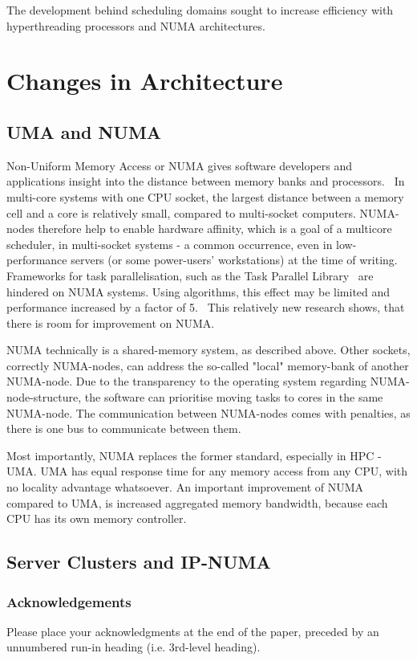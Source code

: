 \documentclass[runningheads]{llncs}
\begin{document}
The development behind scheduling domains sought to increase efficiency with hyperthreading processors and NUMA architectures.\cite{lwn-kernel-dev}

\section{Changes in Architecture}
\subsection{UMA and NUMA}
Non-Uniform Memory Access or NUMA gives software developers and applications insight into the distance between memory banks and processors.~\cite{numa-policies-bolosky} In multi-core systems with one CPU socket, the largest distance between a memory cell and a core is relatively small, compared to multi-socket computers. NUMA-nodes therefore help to enable hardware affinity, which is a goal of a multicore scheduler, in multi-socket systems - a common occurrence, even in low-performance servers (or some power-users' workstations) at the time of writing. Frameworks for task parallelisation, such as the Task Parallel Library~\cite{tpl-microsoft} are hindered on NUMA systems. Using algorithms, this effect may be limited and performance increased by a factor of 5.~\cite{scalable-numa} This relatively new research shows, that there is room for improvement on NUMA.

NUMA technically is a shared-memory system, as described above. Other sockets, correctly NUMA-nodes, can address the so-called "local" memory-bank of another NUMA-node. Due to the transparency to the operating system regarding NUMA-node-structure, the software can prioritise moving tasks to cores in the same NUMA-node. The communication between NUMA-nodes comes with penalties, as there is one bus to communicate between them.

Most importantly, NUMA replaces the former standard, especially in HPC - UMA. UMA has equal response time for any memory access from any CPU, with no locality advantage whatsoever. An important improvement of NUMA compared to UMA, is increased aggregated memory bandwidth, because each CPU has its own memory controller.~\cite{hpc-numa-slides}

\subsection{Server Clusters and IP-NUMA}

\subsubsection{Acknowledgements} Please place your acknowledgments at
the end of the paper, preceded by an unnumbered run-in heading (i.e.
3rd-level heading).
\end{document}
